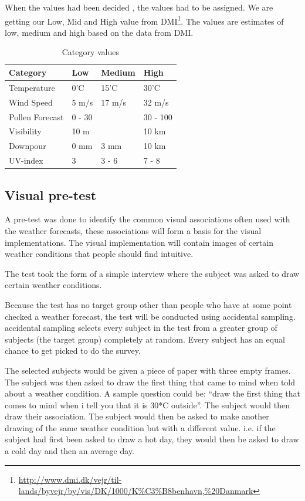 When the values had been decided , the values had to be assigned. We are getting our Low, Mid and High value from DMI\footnote{\url{http://www.dmi.dk/vejr/til-lands/byvejr/by/vis/DK/1000/K\%C3\%B8benhavn,\%20Danmark}}. The values are estimates of low, medium and high based on the data from DMI.

\begin{table}[!h]
\centering
\begin{tabular}{l | l | l | l}
Category & Low & Medium & High \\
\hline \hline
Temperature & 0'C & 15'C & 30'C \\
Wind Speed & 5 m/s & 17 m/s & 32 m/s \\
Pollen Forecast & 0 - 30 & & 30 - 100 \\
Visibility & 10 m & & 10 km \\
Downpour & 0 mm & 3 mm & 10 km \\
UV-index & 3 & 3 - 6 & 7 - 8 
\end{tabular}
\caption{Category values}
\label{tab:category_values}
\end{table}


\subsection{Visual pre-test} %
\label{sub:visual_pre_test}

A pre-test was done to identify the common visual associations often used with the weather forecasts, these associations will form a basis for the visual implementations. 
The visual implementation will contain images of certain weather conditions that people should find intuitive.

The test took the form of a simple interview where the subject was asked to draw certain weather conditions.

Because the test has no target group other than people who have at some point checked a weather forecast, the test will be conducted using accidental sampling.
accidental sampling selects every subject in the test from a greater group of subjects (the target group) completely at random. 
Every subject has an equal chance to get picked to do the survey.

The selected subjects would be given a piece of paper with three empty frames. 
The subject was then asked to draw the first thing that came to mind when told about a weather condition. 
A sample question could be: \enquote{draw the first thing that comes to mind when i tell you that it is 30*C outside}. 
The subject would then draw their association. 
The subject would then be asked to make another drawing of the same weather condition but with a different value. 
i.e. if the subject had first been asked to draw a hot day, they would then be asked to draw a cold day and then an average day.

